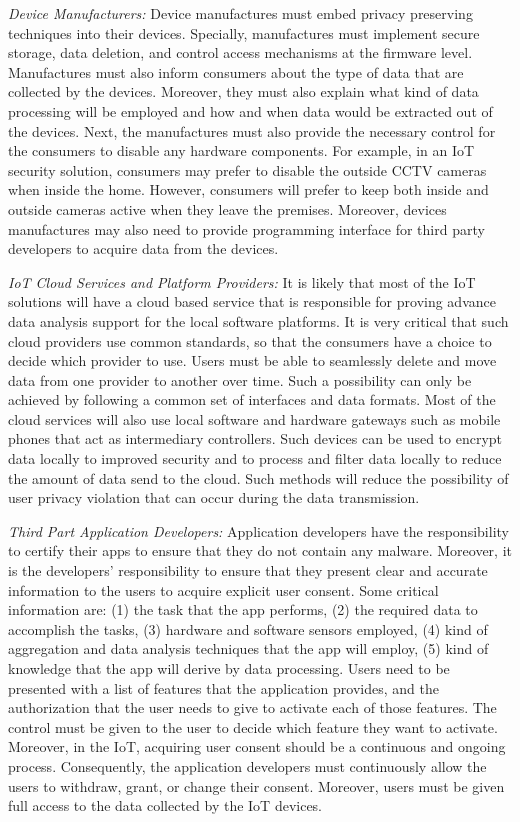 \documentclass[journal]{IEEEtran}
\begin{document}
\textit{Device Manufacturers:} Device manufactures must embed privacy preserving techniques into their devices. Specially, manufactures must implement secure storage, data deletion, and control access mechanisms at the firmware level. Manufactures must also inform consumers about the type of data that are collected by the devices. Moreover, they must also explain what kind of data processing will be employed and how and when data would be extracted out of the devices. Next, the manufactures must also provide the necessary control for the consumers to disable any hardware components. For example, in an IoT security solution, consumers may prefer to disable the outside CCTV cameras when inside the home. However, consumers will prefer to keep both inside and outside cameras active when they leave the premises. Moreover, devices manufactures may also need to provide programming interface for third party developers to acquire data from the devices. 
 
\textit{IoT Cloud Services and Platform Providers:} It is likely that most of the IoT solutions will have a cloud based service that is responsible for proving advance data analysis support for the local software platforms. It is very critical that such cloud providers use common standards, so that the consumers have a choice to decide which provider to use. Users must be able to seamlessly delete and move data from one provider to another over time. Such a possibility can only be achieved by following a common set of interfaces and data formats. Most of the cloud services will also use local software and hardware gateways such as mobile phones that act as intermediary controllers. Such devices can be used to encrypt data locally to improved security and to process and filter data locally to reduce the amount of data send to the cloud. Such methods will reduce the possibility of user privacy violation that can occur during the data transmission.

\textit{Third Part Application Developers:} Application developers have the responsibility to certify their apps to ensure that they do not contain any malware. Moreover, it is the developers' responsibility to ensure that they present clear and accurate information to the users to acquire explicit user consent. Some critical information are: (1) the task that the app performs, (2) the required data to accomplish the tasks, (3) hardware and software sensors employed, (4) kind of aggregation and data analysis techniques that the app will employ, (5) kind of knowledge that the app will derive by data processing. 
Users need to be presented with a list of features that the application provides, and the authorization that the user needs to give to activate each of those features. The control must be given to the user to decide which feature they want to activate. Moreover, in the IoT, acquiring user consent should be a continuous and ongoing process. Consequently, the application developers must continuously allow the users to withdraw, grant, or change their consent. Moreover, users must be given full access to the data collected by the IoT devices. 
\end{document}
